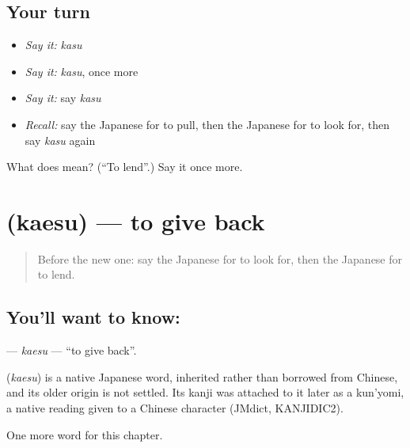 \subsection*{Your turn}
\begin{itemize}
\raggedright
  \item \emph{Say it:} \emph{kasu}
  \item \emph{Say it:} \emph{kasu}, once more
  \item \emph{Say it:} say \emph{kasu}
  \item \emph{Recall:} say the Japanese for to pull, then the Japanese for to look for, then say \emph{kasu} again
\end{itemize}

\begin{tcolorbox}[breakable,colback=teal!4,colframe=teal!35!black,title={Before you move on}]
What does  mean? (\textquotedblleft{}To lend\textquotedblright{}.) Say it once more.
\end{tcolorbox}
\section[\texorpdfstring{\ja{かえす} (kaesu)}{かえす (kaesu)}]{ (kaesu) — to give back}

\label{lesson:JA-C30-kaesu}



\begin{quote}
Before the new one: say the Japanese for to look for, then the Japanese for to lend.
\end{quote}

\subsection*{You'll want to know: }
\textbf{} — \emph{kaesu} — \textquotedblleft{}to give back\textquotedblright{}.

\begin{cousinweb}
\textbf{} (\emph{kaesu}) is a native Japanese word, inherited rather than borrowed from Chinese, and its older origin is not settled. Its kanji was attached to it later as a kun'yomi, a native reading given to a Chinese character (JMdict, KANJIDIC2).
\end{cousinweb}

\begin{grammarlens}[title={What you've built}]
One more word for this chapter.
\end{grammarlens}

